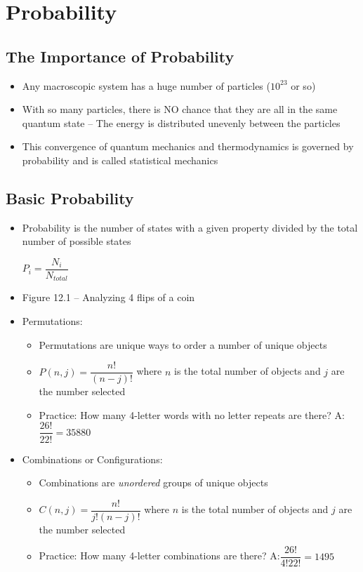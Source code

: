\documentclass[12pt, openany, letterpaper]{memoir}
\begin{document}
\chapter{Probability}
\section*{The Importance of Probability}
\begin{itemize}
	\item Any macroscopic system has a huge number of particles ($10^{23}$ or so)
	\item With so many particles, there is NO chance that they are all in the same quantum state -- The energy is distributed unevenly between the particles
	\item This convergence of quantum mechanics and thermodynamics is governed by probability and is called statistical mechanics	
\end{itemize}
\section*{Basic Probability}
\begin{itemize}
	\item Probability is the number of states with a given property divided by the total number of possible states
	
	$P_i = \dfrac{N_i}{N_{total}}$
	\item Figure 12.1 -- Analyzing 4 flips of a coin
	\item Permutations:
	\begin{itemize}
		\item Permutations are unique ways to order a number of unique objects
		\item $P(n,j) = \dfrac{n!}{(n-j)!}$ where $n$ is the total number of objects and $j$ are the number selected
		\item Practice: How many 4-letter words with no letter repeats are there? A:$\dfrac{26!}{22!} = 35880$
	\end{itemize}
	\item Combinations or Configurations:
	\begin{itemize}
		\item Combinations are \emph{unordered} groups of unique objects
		\item $C(n,j) = \dfrac{n!}{j!(n-j)!}$ where $n$ is the total number of objects and $j$ are the number selected
		\item Practice: How many 4-letter combinations are there? A:$\dfrac{26!}{4!22!}=1495$
	\end{itemize}
\end{itemize}
\end{document}
